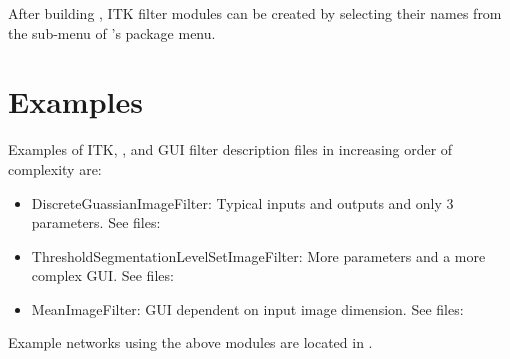 After building \sr{}, ITK filter modules can be created by selecting
their names from the  sub-menu of \sr{}'s 
package menu.

\section{Examples}
\label{sec:itk_mods:example}

Examples of ITK, \sr{}, and GUI filter description files in increasing
order of complexity are:

\begin{itemize}
\item DiscreteGuassianImageFilter: Typical inputs and outputs and only
  3 parameters.  See files:
  \begin{alltt}
  \end{alltt}
\item ThresholdSegmentationLevelSetImageFilter: More parameters and a
  more complex GUI.  See files:
  \begin{alltt}
  \end{alltt}
\item MeanImageFilter: GUI dependent on input image dimension.  See
  files:
  \begin{alltt}
  \end{alltt}
\end{itemize}

Example networks using the above modules are located in
.

